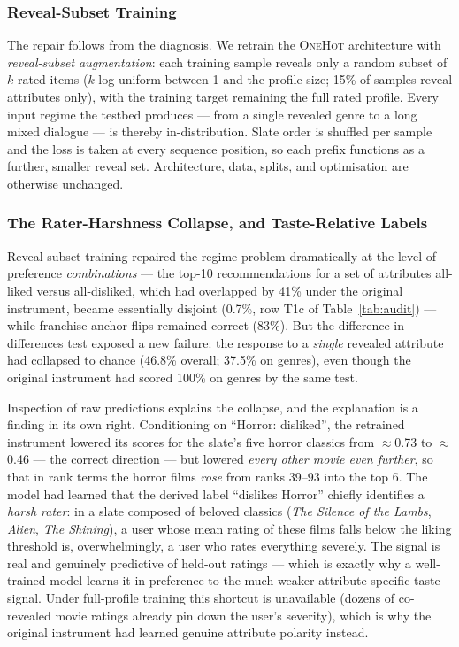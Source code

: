 \documentclass[11pt]{article}
\begin{document}
\subsubsection{Reveal-Subset Training}
\label{sec:reveal_subset}

The repair follows from the diagnosis. We retrain the \textsc{OneHot}
architecture with \emph{reveal-subset augmentation}: each training sample
reveals only a random subset of $k$ rated items ($k$ log-uniform between 1
and the profile size; 15\% of samples reveal attributes only), with the
training target remaining the full rated profile. Every input regime the
testbed produces --- from a single revealed genre to a long mixed dialogue
--- is thereby in-distribution. Slate order is shuffled per sample and the
loss is taken at every sequence position, so each prefix functions as a
further, smaller reveal set. Architecture, data, splits, and optimisation
are otherwise unchanged.

\subsubsection{The Rater-Harshness Collapse, and Taste-Relative Labels}
\label{sec:harshness}

Reveal-subset training repaired the regime problem dramatically at the
level of preference \emph{combinations} --- the top-10 recommendations for
a set of attributes all-liked versus all-disliked, which had overlapped by
41\% under the original instrument, became essentially disjoint (0.7\%,
row T1c of Table~\ref{tab:audit}) --- while franchise-anchor flips
remained correct (83\%). But the difference-in-differences test exposed a
new failure: the response to a \emph{single} revealed attribute had
collapsed to chance (46.8\% overall; 37.5\% on genres), even though the
original instrument had scored 100\% on genres by the same test.

Inspection of raw predictions explains the collapse, and the explanation
is a finding in its own right. Conditioning on ``Horror: disliked'', the
retrained instrument lowered its scores for the slate's five horror
classics from $\approx$0.73 to $\approx$0.46 --- the correct direction ---
but lowered \emph{every other movie even further}, so that in rank terms
the horror films \emph{rose} from ranks 39--93 into the top 6. The model
had learned that the derived label ``dislikes Horror'' chiefly identifies
a \emph{harsh rater}: in a slate composed of beloved classics
(\emph{The Silence of the Lambs}, \emph{Alien}, \emph{The Shining}), a
user whose mean rating of these films falls below the liking threshold is,
overwhelmingly, a user who rates everything severely. The signal is real
and genuinely predictive of held-out ratings --- which is exactly why a
well-trained model learns it in preference to the much weaker
attribute-specific taste signal. Under full-profile training this
shortcut is unavailable (dozens of co-revealed movie ratings already pin
down the user's severity), which is why the original instrument had
learned genuine attribute polarity instead.
\end{document}
